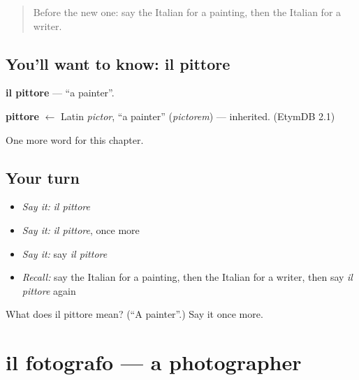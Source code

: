 \label{lesson:IT-C223-pittore}



\begin{quote}
Before the new one: say the Italian for a painting, then the Italian for a writer.
\end{quote}

\subsection*{You'll want to know: il pittore}
\textbf{il pittore} — \textquotedblleft{}a painter\textquotedblright{}.

\begin{cousinweb}
\textbf{pittore} $\leftarrow$ Latin \emph{pictor}, \textquotedblleft{}a painter\textquotedblright{} (\emph{pictorem}) — inherited. (EtymDB 2.1)
\end{cousinweb}

\begin{grammarlens}[title={What you've built}]
One more word for this chapter.
\end{grammarlens}

\subsection*{Your turn}
\begin{itemize}
\raggedright
  \item \emph{Say it:} \emph{il pittore}
  \item \emph{Say it:} \emph{il pittore}, once more
  \item \emph{Say it:} say \emph{il pittore}
  \item \emph{Recall:} say the Italian for a painting, then the Italian for a writer, then say \emph{il pittore} again
\end{itemize}

\begin{tcolorbox}[breakable,colback=teal!4,colframe=teal!35!black,title={Before you move on}]
What does il pittore mean? (\textquotedblleft{}A painter\textquotedblright{}.) Say it once more.
\end{tcolorbox}
\section[il fotografo]{il fotografo — a photographer}

\label{lesson:IT-C223-fotografo}




